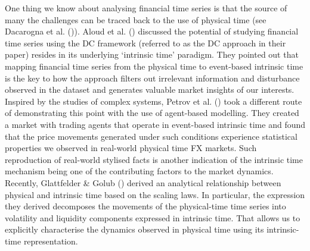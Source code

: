 One thing we know about analysing financial time series is that the source of many the challenges can be traced back to the use of physical time (see Dacarogna et al. (\citeyear{genccay2001introduction})). Aloud et al. (\citeyear{aloud2012directional}) discussed the potential of studying financial time series using the DC framework (referred to as the DC approach in their paper) resides in its underlying `intrinsic time' paradigm. They pointed out that mapping financial time series from the physical time to event-based intrinsic time is the key to how the approach filters out irrelevant information and disturbance observed in the dataset and generates valuable market insights of our interests. Inspired by the studies of complex systems, Petrov et al. (\citeyear{petrov2018agent}) took a different route of demonstrating this point with the use of agent-based modelling. They created a market with trading agents that operate in event-based intrinsic time and found that the price movements generated under such conditions experience statistical properties we observed in real-world physical time FX markets. Such reproduction of real-world stylised facts is another indication of the intrinsic time mechanism being one of the contributing factors to the market dynamics. Recently, Glattfelder \& Golub (\citeyear{glattfelder2022bridging}) derived an analytical relationship between physical and intrinsic time based on the scaling laws. In particular, the expression they derived decomposes the movements of the physical-time time series into volatility and liquidity components expressed in intrinsic time. That allows us to explicitly characterise the dynamics observed in physical time using its intrinsic-time representation.

